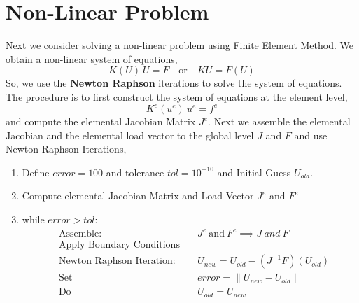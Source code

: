 \section{Non-Linear Problem}
Next we consider solving a non-linear problem using Finite Element Method. We obtain a non-linear system of equations,
\begin{equation}
	K(U) \ U = F \quad \text{or} \quad K U = F(U) 
\end{equation}
So, we use the \textbf{Newton Raphson} iterations to solve the system of equations. The procedure is to first construct the system of equations at the element level,
\begin{equation}
	K^e(u^e) \ u^e = f^e
\end{equation}
and compute the elemental Jacobian Matrix $J^e$. Next we assemble the elemental Jacobian and the elemental load vector to the global level $J$ and $F$ and use Newton Raphson Iterations,
\begin{enumerate}
	\item Define $error = 100$ and tolerance $tol = 10^{-10}$ and Initial Guess $U_{old}$.
	\item Compute elemental Jacobian Matrix and Load Vector $J^e$ and $F^e$
	\item while $error > tol$:
	\begin{eqnarray}\nonumber
		&\text{Assemble: }& \quad J^e \ \text{and} \ F^e \implies J \ and \ F\\\nonumber
		&\text{Apply Boundary Conditions}&\\\nonumber
		& \text{Newton Raphson Iteration:}& \quad U_{new} = U_{old} - (J^{-1} F)(U_{old})\\\nonumber
		& \text{Set} & \quad error = \lVert U_{new} - U_{old} \rVert\\\nonumber
		& \text{Do} & \quad U_{old} = U_{new}
	\end{eqnarray}
\end{enumerate}

